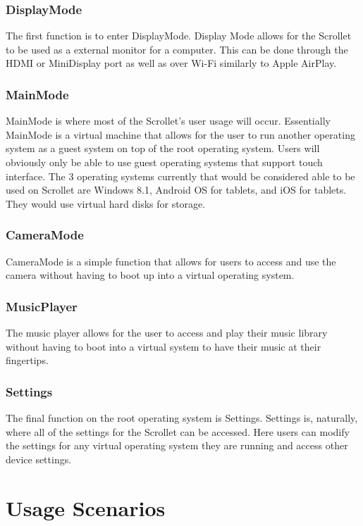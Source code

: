 \documentclass[a4paper]{article}
\begin{document}
\subsubsection{DisplayMode}
The first function is to enter DisplayMode. Display Mode allows for the Scrollet to be used as a external monitor for a computer. This can be done through the HDMI or MiniDisplay port as well as over Wi-Fi similarly to Apple AirPlay.

\subsubsection{MainMode}
MainMode is where most of the Scrollet's user usage will occur. Essentially MainMode is a virtual machine that allows for the user to run another operating system as a guest system on top of the root operating system. Users will obviously only be able to use guest operating systems that support touch interface. The 3 operating systems currently that would be considered able to be used on Scrollet are Windows 8.1, Android OS for tablets, and iOS for tablets. They would use virtual hard disks for storage.

\subsubsection{CameraMode}
CameraMode is a simple function that allows for users to access and use the camera without having to boot up into a virtual operating system.

\subsubsection{MusicPlayer}
The music player allows for the user to access and play their music library without having to boot into a virtual system to have their music at their fingertips.

\subsubsection{Settings}
The final function on the root operating system is Settings. Settings is, naturally, where all of the settings for the Scrollet can be accessed. Here users can modify the settings for any virtual operating system they are running and access other device settings.




\section{Usage Scenarios}
\end{document}
